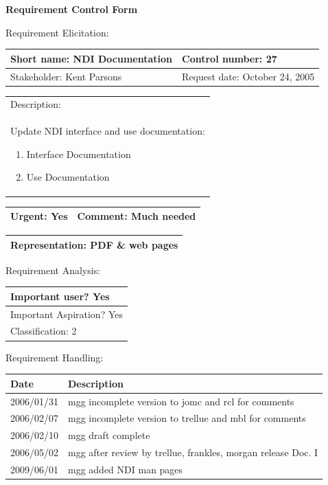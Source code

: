 \begin{center}\Large\bf
Requirement Control Form
\end{center}
\vspace{24pt}

Requirement Elicitation:

\begin{tabular}{|p{211pt}|p{211pt}|} \hline
Short name: NDI Documentation & Control number: 27\\ \hline
Stakeholder: Kent Parsons & Request date: October 24, 2005\\
\end{tabular}
\begin{tabular}{|p{433pt}|} \hline
Description: \\ 
Update NDI interface and use documentation:
\begin{enumerate}
\item Interface Documentation
\item Use Documentation
\end{enumerate} \\
\hline
\end{tabular} 
\begin{tabular}{|p{211pt}|p{211pt}|} \hline
Urgent: Yes & Comment: Much needed\\ \hline
\end{tabular}

\vspace{12pt}

\begin{tabular}{|p{433pt}|} \hline
Representation: PDF \& web pages \\ \hline
\end{tabular}
\vspace{24pt}

Requirement Analysis:

\begin{tabular}{|p{433pt}|} \hline
Important user? Yes \\ \hline
Important Aspiration? Yes \\ \hline
Classification: 2 \\ \hline
\end{tabular}
\vspace{24pt}

Requirement Handling:

\begin{tabular}{|p{72pt}|p{351pt}|} \hline
Date & Description \\ \hline
2006/01/31 & mgg incomplete version to jomc and rcl for comments\\ \hline
2006/02/07 & mgg incomplete version to trellue and mbl for comments\\ \hline
2006/02/10 & mgg draft complete\\ \hline
2006/05/02 & mgg after review by trellue, frankles, morgan release
Doc. I\\ \hline 
2009/06/01 & mgg added NDI man pages \\ \hline
\end{tabular}
